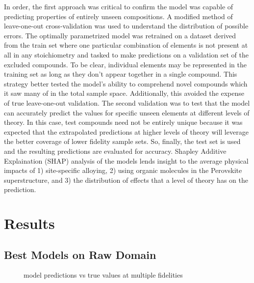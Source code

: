 In order, the first approach was critical to confirm the model was capable of predicting properties of entirely unseen compositions.
A modified method of leave-one-out cross-validation was used to understand the distribution of possible errors.
The optimally parametrized model was retrained on a dataset derived from the train set where one particular combination of elements is not present at all in any stoichiometry and tasked to make predictions on a validation set of the excluded compounds.
To be clear, individual elements may be represented in the training set as long as they don't appear together in a single compound.
This strategy better tested the model's ability to comprehend novel compounds which it saw many of in the total sample space.
Additionally, this avoided the expense of true leave-one-out validation.
The second validation was to test that the model can accurately predict the values for specific unseen elements at different levels of theory.
In this case, test compounds need not be entirely unique because it was expected that the extrapolated predictions at higher levels of theory will leverage the better coverage of lower fidelity sample sets.
So, finally, the test set is used and the resulting predictions are evaluated for accuracy.
Shapley Additive Explaination (SHAP) analysis of the models lends insight to the average physical impacts of 1) site-specific alloying, 2) using organic molecules in the Perovskite superstructure, and 3) the distribution of effects that a level of theory has on the prediction.

\section{Results}
\label{sec:orgfa003dc}
\subsection{Best Models on Raw Domain}
\label{sec:orgf476608}
 
\begin{figure}[htbp]
\centering

\caption{\label{fig:pairplots} model predictions vs true values at multiple fidelities}
\end{figure}

